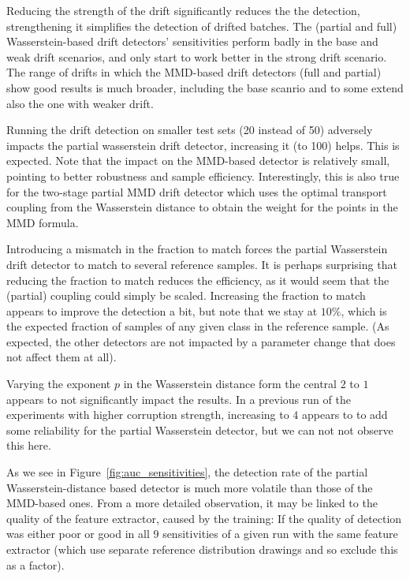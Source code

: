 \documentclass[a4paper,twoside,10pt]{article}
\theoremstyle{plain}
\theoremstyle{remark}
\begin{document}
Reducing the strength of the drift significantly reduces the the detection, strengthening it simplifies the detection of drifted batches. The (partial and full) Wasserstein-based drift detectors' sensitivities perform badly in the base and weak drift scenarios, and only start to work better in the strong drift scenario. The range of drifts in which the MMD-based drift detectors (full and partial) show good results is much broader, including the base scanrio and to some extend also the one with weaker drift.

Running the drift detection on smaller test sets (20 instead of 50) adversely impacts the partial wasserstein drift detector, increasing it (to 100) helps. This is expected. Note that the impact on the MMD-based detector is relatively small, pointing to better robustness and sample efficiency. Interestingly, this is also true for the two-stage partial MMD drift detector which uses the optimal transport coupling from the Wasserstein distance to obtain the weight for the points in the MMD formula.

Introducing a mismatch in the fraction to match forces the partial Wasserstein drift detector to match to several reference samples. It is perhaps surprising that reducing the fraction to match reduces the efficiency, as it would seem that the (partial) coupling could simply be scaled. Increasing the fraction to match appears to improve the detection a bit, but note that we stay at $10\%$, which is the expected fraction of samples of any given class in the reference sample. (As expected, the other detectors are not impacted by a parameter change that does not affect them at all).

Varying the exponent $p$ in the Wasserstein distance form the central $2$ to $1$ appears to not significantly impact the results. In a previous run of the experiments with higher corruption strength, increasing to $4$ appears to to add some reliability for the partial Wasserstein detector, but we can not not observe this here.

As we see in Figure~\ref{fig:auc_sensitivities}, the detection rate of the partial Wasserstein-distance based detector is much more volatile than those of the MMD-based ones. From a more detailed observation, it may be linked to the quality of the feature extractor, caused by the training: If the quality of detection was either poor or good in all 9 sensitivities of a given run with the same feature extractor (which use separate reference distribution drawings and so exclude this as a factor).
\end{document}

